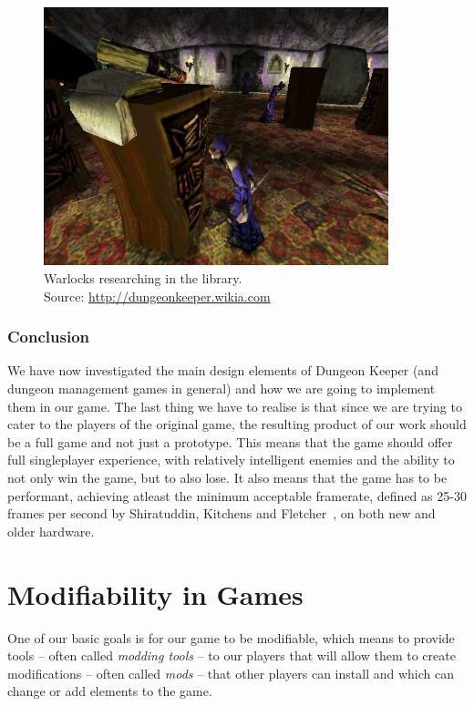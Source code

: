 \begin{figure}[h]
    \centering
    \includegraphics[width=10cm]{../img/library.jpg}
    \caption{Warlocks researching in the library.
             \\Source: \href{http://vignette2.wikia.nocookie.net/dungeonkeeper/images/9/98/Library.jpg/revision/latest?cb=20120808211437}{http://dungeonkeeper.wikia.com}}
    \label{dk-lib}
\end{figure}

\subsubsection{Conclusion}

We have now investigated the main design elements of Dungeon Keeper (and dungeon management games in general) and how we are going 
to implement them in our game. The last thing we have to realise is that since we are trying to cater to the players of the original
game, the resulting product of our work should be a full game and not just a prototype. This means that the game should offer full 
singleplayer experience, with relatively intelligent enemies and the ability to not only win the game, but to also lose. It also means
that the game has to be performant, achieving atleast the minimum acceptable framerate, defined as 25-30 frames per second by 
Shiratuddin, Kitchens and Fletcher~\cite{AcceptableFPS}, on both new and older hardware.

\section{Modifiability in Games}

One of our basic goals is for our game to be modifiable, which means to provide tools -- often called \emph{modding tools} -- to our players
that will allow them to create modifications -- often called \emph{mods} -- that other players can install and which can change or
add elements to the game.

